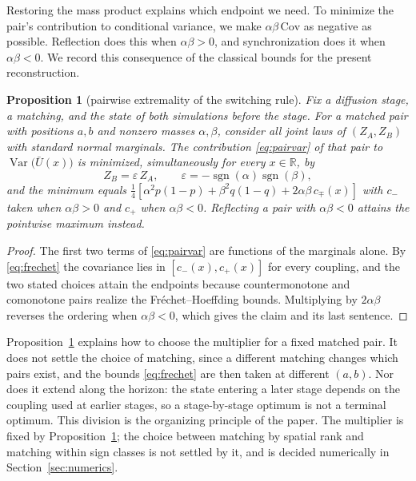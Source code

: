 \documentclass[smallextended,nospthms]{svjour3}
\theoremstyle{plain}
\newtheorem{proposition}{Proposition}[section]
\theoremstyle{definition}
\theoremstyle{remark}
\numberwithin{equation}{section}
\newcommand{\Var}{\operatorname{Var}}
\newcommand{\R}{\mathbb{R}}
\newcommand{\sgn}{\operatorname{sgn}}
\begin{document}
Restoring the mass product explains which endpoint we need. To minimize the
pair's contribution to conditional variance, we make
$\alpha\beta\,\mathrm{Cov}$ as negative as possible. Reflection does this when
$\alpha\beta>0$, and synchronization does it when $\alpha\beta<0$. We record
this consequence of the classical bounds for the present reconstruction.

\begin{proposition}[pairwise extremality of the switching rule]
\label{prop:pairwise}
Fix a diffusion stage, a matching, and the state of both simulations before the
stage. For a matched pair with positions $a,b$ and nonzero masses $\alpha,\beta$,
consider all joint laws of $(Z_A,Z_B)$ with standard normal marginals. The
contribution \eqref{eq:pairvar} of that pair to $\Var\bigl(\bar U(x)\bigr)$ is
minimized, simultaneously for every $x\in\R$, by
\[
 Z_B=\varepsilon\,Z_A,\qquad \varepsilon=-\sgn(\alpha)\sgn(\beta),
\]
and the minimum equals
$\tfrac14[\alpha^2 p(1-p)+\beta^2 q(1-q)+2\alpha\beta\,c_{\mp}(x)]$ with
$c_-$ taken when $\alpha\beta>0$ and $c_+$ when $\alpha\beta<0$. Reflecting a
pair with $\alpha\beta<0$ attains the pointwise \emph{maximum} instead.
\end{proposition}

\begin{proof}
The first two terms of \eqref{eq:pairvar} are functions of the marginals alone.
By \eqref{eq:frechet} the covariance lies in $[c_-(x),c_+(x)]$ for every
coupling, and the two stated choices attain the endpoints because
countermonotone and comonotone pairs realize the Fréchet--Hoeffding bounds.
Multiplying by $2\alpha\beta$ reverses the ordering when $\alpha\beta<0$, which
gives the claim and its last sentence.
\end{proof}

Proposition~\ref{prop:pairwise} explains how to choose the multiplier for a
fixed matched pair. It does
not settle the choice of matching, since a different matching changes which
pairs exist, and the bounds \eqref{eq:frechet} are then taken at different
$(a,b)$. Nor does it extend along the horizon: the state entering a later stage
depends on the coupling used at earlier stages, so a stage-by-stage optimum is
not a terminal optimum. This division is the organizing principle of the paper.
The multiplier is fixed by Proposition~\ref{prop:pairwise}; the choice between
matching by spatial rank and matching within sign classes is not settled by it,
and is decided numerically in Section~\ref{sec:numerics}.
\end{document}
